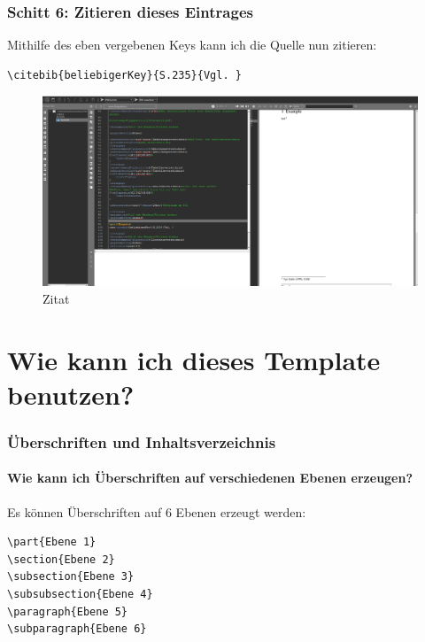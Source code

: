 \documentclass[12pt]{article}
\begin{document}
\section{Schitt 6: Zitieren dieses Eintrages}
Mithilfe des eben vergebenen Keys kann ich die Quelle nun zitieren:
\begin{verbatim}
\citebib{beliebigerKey}{S.235}{Vgl. }
\end{verbatim}
\FloatBarrier
\begin{figure}[!ht]
\includegraphics[width=.9\textwidth]{images/cited.png}
\caption{Zitat}
\end{figure}
\FloatBarrier

\part{Wie kann ich dieses Template benutzen?}

\section{Überschriften und Inhaltsverzeichnis}

\subsection{Wie kann ich Überschriften auf verschiedenen Ebenen erzeugen?}
Es können Überschriften auf 6 Ebenen erzeugt werden:
\begin{verbatim}
\part{Ebene 1}
\section{Ebene 2}
\subsection{Ebene 3}
\subsubsection{Ebene 4}
\paragraph{Ebene 5}
\subparagraph{Ebene 6}
\end{verbatim}
\end{document}
